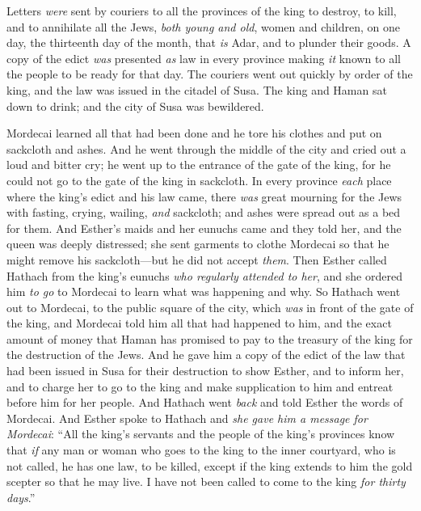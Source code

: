 \begin{biblechapter}
\verse Letters \textit{were} sent by couriers to all the provinces of the king to destroy, to kill, and to annihilate all the Jews, \textit{both young and old}, women and children, on one day, the thirteenth day of the month, that \textit{is} Adar, and to plunder their goods.
\verse A copy of the edict \textit{was} presented \textit{as} law in every province making \textit{it} known to all the people to be ready for that day.
\verse The couriers went out quickly by order of the king, and the law was issued in the citadel of Susa. The king and Haman sat down to drink; and the city of Susa was bewildered.
\end{biblechapter}

\begin{biblechapter} %
 Mordecai learned all that had been done and he tore his clothes and put on sackcloth and ashes. And he went through the middle of the city and cried out a loud and bitter cry;
\verse he went up to the entrance of the gate of the king, for he could not go to the gate of the king in sackcloth.
\verse In every province \textit{each} place where the king’s edict and his law came, there \textit{was} great mourning for the Jews with fasting, crying, wailing, \textit{and} sackcloth; and ashes were spread out as a bed for them.
\verse And Esther’s maids and her eunuchs came and they told her, and the queen was deeply distressed; she sent garments to clothe Mordecai so that he might remove his sackcloth—but he did not accept \textit{them}.
\verse Then Esther called Hathach from the king’s eunuchs \textit{who regularly attended to her}, and she ordered him \textit{to go} to Mordecai to learn what was happening and why.
\verse So Hathach went out to Mordecai, to the public square of the city, which \textit{was} in front of the gate of the king,
\verse and Mordecai told him all that had happened to him, and the exact amount of money that Haman has promised to pay to the treasury of the king for the destruction of the Jews.
\verse And he gave him a copy of the edict of the law that had been issued in Susa for their destruction to show Esther, and to inform her, and to charge her to go to the king and make supplication to him and entreat before him for her people.
\verse And Hathach went \textit{back} and told Esther the words of Mordecai.
\verse And Esther spoke to Hathach and \textit{she gave him a message for Mordecai}:
\verse “All the king’s servants and the people of the king’s provinces know that \textit{if} any man or woman who goes to the king to the inner courtyard, who is not called, he has one law, to be killed, except if the king extends to him the gold scepter so that he may live. I have not been called to come to the king \textit{for thirty days}.”

\end{biblechapter}
